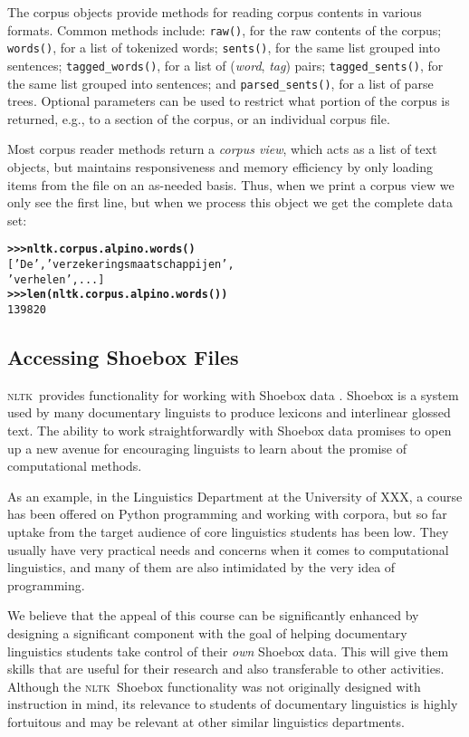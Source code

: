 \documentclass[11pt]{article}
\newcommand{\NLTK}{\textsc{nltk}}
\newcommand{\code}[1]{\texttt{\small #1}}
\begin{document}
The corpus objects provide methods for reading corpus contents
in various formats.  Common methods include:
%
\code{raw()}, for the raw contents of the corpus;
\code{words()}, for a list of tokenized words;
\code{sents()}, for the same list grouped into sentences;
\code{tagged\_words()}, for a list of (\textit{word}, \textit{tag}) pairs;
\code{tagged\_sents()}, for the same list grouped into sentences;
and
\code{parsed\_sents()}, for a list of parse trees.
%
Optional parameters can be used to restrict what portion of the corpus
is returned, e.g., to a section of the corpus, or an individual corpus
file.

Most corpus reader methods return a \emph{corpus view}, which acts as
a list of text objects, but maintains responsiveness and memory
efficiency by only loading items from the file on an as-needed basis.
Thus, when we print a corpus view we only see the first line, but when
we process this object we get the complete data set:

{\footnotesize
\begin{alltt}
\textbf{>>> nltk.corpus.alpino.words()}
['De', 'verzekeringsmaatschappijen',
'verhelen', ...]
\textbf{>>> len(nltk.corpus.alpino.words())}
139820
\end{alltt}}

\subsection{Accessing Shoebox Files}

\NLTK\ provides functionality for working with Shoebox data
\cite{robinson:etal:2007}. Shoebox is a system used by many
documentary linguists to produce lexicons and interlinear glossed text.  The
ability to work straightforwardly with Shoebox data promises to open
up a new avenue for encouraging linguists to learn about the promise
of computational methods. 

As an example, in the Linguistics Department at the University of
XXX, a course has been offered on Python programming and
working with corpora, but so far uptake from the
target audience of core linguistics students has been low. They usually have very
practical needs and concerns when it comes to computational
linguistics, and many of them are also intimidated by the very idea of
programming. %

We believe that the appeal of this course can be significantly
enhanced by designing a significant component
with the goal of helping documentary linguistics students take control of their
\emph{own} Shoebox data. This will give them  skills that are
useful for their research and also transferable to other activities.
Although the \NLTK\ Shoebox functionality was not
originally designed with instruction in mind, its relevance to
students of documentary linguistics is highly fortuitous and
may be relevant at other similar linguistics departments.
\end{document}
